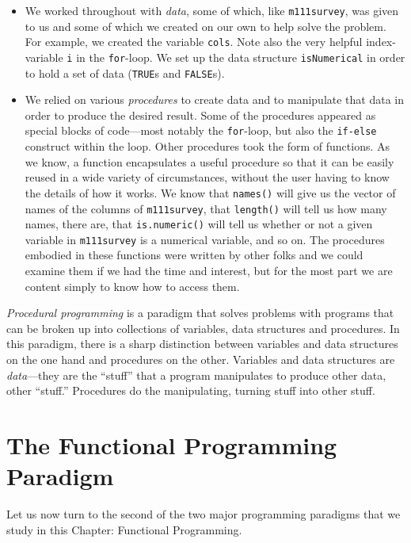 \documentclass[]{book}
\providecommand{\tightlist}{%
  \setlength{\itemsep}{0pt}\setlength{\parskip}{0pt}}
\theoremstyle{definition}
\theoremstyle{definition}
\theoremstyle{definition}
\theoremstyle{remark}
\begin{document}
{\begin{itemize}
\tightlist
\item
  We worked throughout with \emph{data}, some of which, like
  \texttt{m111survey}, was given to us and some of which we created on
  our own to help solve the problem. For example, we created the
  variable \texttt{cols}. Note also the very helpful index-variable
  \texttt{i} in the \texttt{for}-loop. We set up the data structure
  \texttt{isNumerical} in order to hold a set of data (\texttt{TRUE}s
  and \texttt{FALSE}s).
\item
  We relied on various \emph{procedures} to create data and to
  manipulate that data in order to produce the desired result. Some of
  the procedures appeared as special blocks of code---most notably the
  \texttt{for}-loop, but also the \texttt{if-else} construct within the
  loop. Other procedures took the form of functions. As we know, a
  function encapsulates a useful procedure so that it can be easily
  reused in a wide variety of circumstances, without the user having to
  know the details of how it works. We know that \texttt{names()} will
  give us the vector of names of the columns of \texttt{m111survey},
  that \texttt{length()} will tell us how many names, there are, that
  \texttt{is.numeric()} will tell us whether or not a given variable in
  \texttt{m111survey} is a numerical variable, and so on. The procedures
  embodied in these functions were written by other folks and we could
  examine them if we had the time and interest, but for the most part we
  are content simply to know how to access them.
\end{itemize}

\emph{Procedural programming} is a
paradigm that solves problems with programs that can be broken up into
collections of variables, data structures and procedures. In this
paradigm, there is a sharp distinction between variables and data
structures on the one hand and procedures on the other. Variables and
data structures are \emph{data}---they are the ``stuff'' that a program
manipulates to produce other data, other ``stuff.'' Procedures do the
manipulating, turning stuff into other stuff.

\section{The Functional Programming
Paradigm}\label{the-functional-programming-paradigm}

Let us now turn to the second of the two major programming paradigms
that we study in this Chapter: Functional Programming.

}
\end{document}
